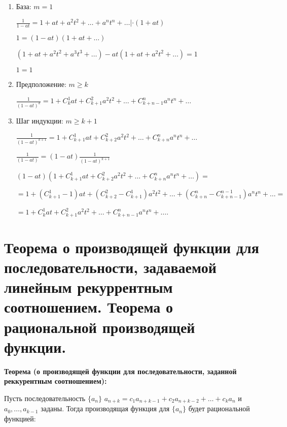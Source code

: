     \begin{enumerate}
        \item{База: $m = 1$
        \bigskip
        
        $\frac{1}{1 - at} = 1 + at + a^2 t^2 + \dots + a^n t^n + \dots | \cdot (1 + at)$
        \smallskip

        $1 = (1 - at)(1 + at + \dots)$
        \smallskip
        
        $(1 + at + a^2t^2 + a^3t^3 + \dots) - at(1 + at + a^2 t^2 + \dots) = 1$
        \smallskip

        $1 = 1$
        }
        \item{Предположение: $m \geq k$
        \bigskip
        
        $\frac{1}{(1 - at)^k} = 1 + C^1_k a t + C^2_{k + 1} a^2 t^2 + \dots +
        C^n_{k + n - 1} a^n t^n + \dots$
        }
        \item{Шаг индукции: $m \geq k + 1$
        \bigskip
        
        $\frac{1}{(1 - at)^{k + 1}} = 1 + C^1_{k + 1} a t + C^2_{k + 2} a^2 t^2 + 
        \dots + C^n_{k + n} a^n t^n + \dots$
        \smallskip
        
        $\frac{1}{(1 - at)} = (1 - at)\frac{1}{(1 - at)^{k + 1}}$
        \smallskip
        
        $(1 - at)(1 + C^1_{k + 1} at + C^2_{k + 2} a^2t^2 + \dots + C^n_{k + n}
        a^nt^n + \dots) =$
        \smallskip
        
        $ = 1 + (C^1_{k + 1} - 1)at + (C^2_{k + 2} - C^1_{k + 1})
        a^2t^2 + \dots + (C^n_{k + n} - C^{n - 1}_{k + n - 1})a^nt^n + \dots =$
        \smallskip

        $ = 1 + C^1_{k} at + C^2_{k + 1}a^2t^2 + \dots + C^n_{k + n - 1}a^n t^n + \dots$.
        
        }
    \end{enumerate}

\section{Теорема о производящей функции для последовательности, задаваемой линейным 
рекуррентным соотношением. Теорема о рациональной производящей функции.}    

\textbf{Теорема (о производящей функции для последовательности,
заданной реккурентным соотношением):}
    \smallskip

    Пусть последовательность $\{a_n\}$ $a_{n + k} = c_1 a_{n + k - 1} +
    c_2 a_{n + k - 2} + \dots + c_k a_n$ и $a_0, \dots, a_{k - 1}$ заданы.
    Тогда производящая функция для $\{a_n\}$ будет рациональной функцией:


